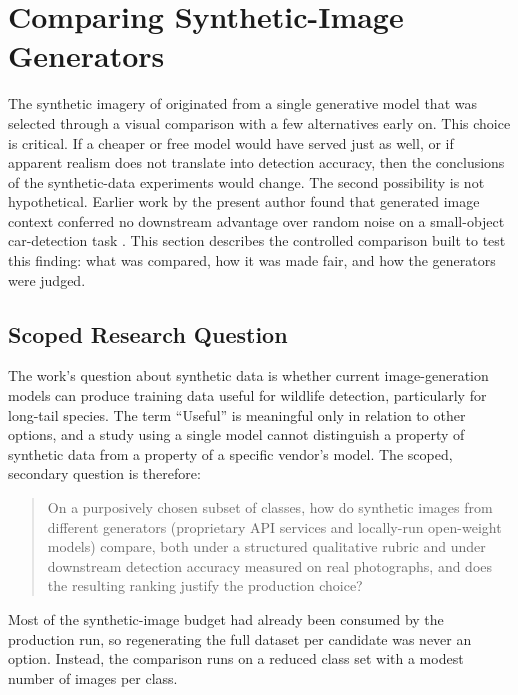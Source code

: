 \section{Comparing Synthetic-Image Generators}\label{sec:generator_comparison}

The synthetic imagery of  originated from a single generative model that was selected through a visual comparison with a few alternatives early on. This choice is critical. If a cheaper or free model would have served just as well, or if apparent realism does not translate into detection accuracy, then the conclusions of the synthetic-data experiments would change. The second possibility is not hypothetical. Earlier work by the present author found that generated image context conferred no downstream advantage over random noise on a small-object car-detection task \cite{hedrichGeneratingSyntheticDatasets2026}. This section describes the controlled comparison built to test this finding: what was compared, how it was made fair, and how the generators were judged.

\subsection{Scoped Research Question}\label{sec:generator_comparison_motivation}

The work's question about synthetic data is whether current image-generation models can produce training data useful for wildlife detection, particularly for long-tail species. The term \enquote{Useful} is meaningful only in relation to other options, and a study using a single model cannot distinguish a property of synthetic data from a property of a specific vendor's model. The scoped, secondary question is therefore:

\begin{quote}
On a purposively chosen subset of classes, how do synthetic images from different generators (proprietary API services and locally-run open-weight models) compare, both under a structured qualitative rubric and under downstream detection accuracy measured on real photographs, and does the resulting ranking justify the production choice?
\end{quote}

Most of the synthetic-image budget had already been consumed by the production run, so regenerating the full dataset per candidate was never an option. Instead, the comparison runs on a reduced class set with a modest number of images per class.

